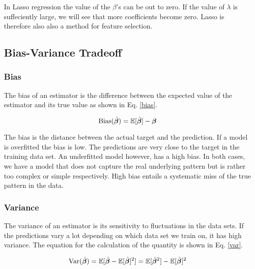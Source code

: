 In Lasso regression the value of the $\beta$'s can be out to zero. If the value of $\lambda$ is suffeciently large, we will see that more coefficients become zero. Lasso is therefore also also a method for feature selection. 



\subsection{Bias-Variance Tradeoff}


\subsubsection{Bias}
The bias of an estimator is the difference between the expected value of the estimator and its true value as shown in Eq. \ref{bias}. 

\begin{equation}\label{bias}
    \text{Bias}(\hat{\boldsymbol{\beta}}) = \mathbb{E}[\hat{\boldsymbol{\beta}}]-\boldsymbol{\beta}
\end{equation}

The bias is the distance between the actual target and the prediction. If a model is overfitted the bias is low. The predictions are very close to the target in the training data set. An underfitted model however, has a high bias. In both cases, we have a model that does not capture the real underlying pattern but is rather too complex or simple respectively. High bias entails a systematic miss of the true pattern in the data. %

\subsubsection{Variance}

The variance of an estimator is its sensitivity to fluctuations in the data sets. If the predictions vary a lot depending on which data set we train on, it has high variance. The equation for the calculation of the quantity is shown in Eq. \ref{var}. 

\begin{equation}\label{var}
    \text{Var}(\hat{\boldsymbol{\beta}}) = \mathbb{E}[\hat{\boldsymbol{\beta}}-\mathbb{E}[\hat{\boldsymbol{\beta}}]^2] = \mathbb{E}[\hat{\boldsymbol{\beta}}^2] - \mathbb{E}[\hat{\boldsymbol{\beta}}]^2
\end{equation}

